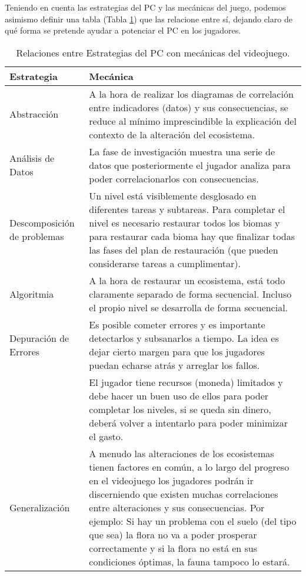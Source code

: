 Teniendo en cuenta las estrategias del PC y las mecánicas del juego, podemos asimismo definir una tabla (Tabla \ref{fig:tablaPCMecanicas}) que las relacione entre sí, dejando claro de qué forma se pretende ayudar a potenciar el PC en los jugadores.
\raggedbottom
\begin{table}[H]
\begin{center}
\setlength{\tabcolsep}{5pt}
\renewcommand{\arraystretch}{1.2}
\begin{tabular}{ | m{8em} | m{30em} | } 
  \hline
  Estrategia & Mecánica \\ 
  \hline
  Abstracción & A la hora de realizar los diagramas de correlación entre indicadores (datos) y sus consecuencias, se reduce al mínimo imprescindible la explicación del contexto de la alteración del ecosistema. \\ 
  \hline
  Análisis de Datos & La fase de investigación muestra una serie de datos que posteriormente el jugador analiza para poder correlacionarlos con consecuencias. \\ 
  \hline
  Descomposición de problemas & Un nivel está visiblemente desglosado en diferentes tareas y subtareas. Para completar el nivel es necesario restaurar todos los biomas y para restaurar cada bioma hay que finalizar todas las fases del plan de restauración (que pueden considerarse tareas a cumplimentar). \\ 
  \hline
  Algoritmia & A la hora de restaurar un ecosistema, está todo claramente separado de forma secuencial. Incluso el propio nivel se desarrolla de forma secuencial. \\ 
  \hline
  Depuración de Errores & Es posible cometer errores y es importante detectarlos y subsanarlos a tiempo. La idea es dejar cierto margen para que los jugadores puedan echarse atrás y arreglar los fallos. \\ 
  \hline
    & El jugador tiene recursos (moneda) limitados y debe hacer un buen uso de ellos para poder completar los niveles, si se queda sin dinero, deberá volver a intentarlo para poder minimizar el gasto. \\ 
  \hline
  Generalización & A menudo las alteraciones de los ecosistemas tienen factores en común, a lo largo del progreso en el videojuego los jugadores podrán ir discerniendo que existen muchas correlaciones entre alteraciones y sus consecuencias. Por ejemplo: Si hay un problema con el suelo (del tipo que sea) la flora no va a poder prosperar correctamente y si la flora no está en sus condiciones óptimas, la fauna tampoco lo estará. \\ 
  \hline
\end{tabular}
\centering
\caption{Relaciones entre Estrategias del PC con mecánicas del videojuego.}
\label{fig:tablaPCMecanicas}
\end{center}
\end{table}


